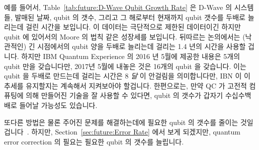 예를 들어서, Table~\ref{tab:future:D-Wave Qubit Growth Rate} 은 D-Wave 의
시스템들, 발매된 날짜, qubit 의 갯수, 그리고 그 해로부터 현재까지 qubit 갯수를
두배로 늘리는데 걸린 시간을 보입니다.
이 데이터는 극단적으로 제한된 데이터이긴 하지만 qubit 에 있어서의 Moore 의 법칙
같은 성장세를 보입니다.
뒤따르는 논의에서는 (낙관적인) 긴 시점에서의 qubit 양을 두배로 늘리는데 걸리는
1.4 년의 시간을 사용할 겁니다.
하지만 IBM Quantum Experience 의 2016 년 5월에 제공한 내용은 5개의 qubit 만을
갖습니다만, 2017년 5월에 내놓은 것은 16개의 qubit 을 갖습니다.
이는 qubit 을 두배로 만드는데 걸리는 시간은 8 \emph{달} 이 안걸림을
의미합니다만, IBN 이 이 추세를 유지할지는 계속해서 지켜보아야 할겁니다.
한편으로는, 만약 QC 가 고전적 컴퓨팅에 의해 만들어진 기술을 잘 사용할 수
있다면, qubit 의 갯수가 갑자기 수십수백배로 들어날 가능성도 있습니다.

또다른 방법은 물론 주어진 문제를 해결하는데에 필요한 qubit 의 갯수를 줄이는
것일 겁니다~\cite{SergeyBravyi2017-QC-SimulateFermionicHamiltonians}.
하지만, Section~\ref{sec:future:Error Rate} 에서 보게 되겠지만, quantum error
correction 의 필요는 필요한 qubit 의 갯수를 늘립니다.

